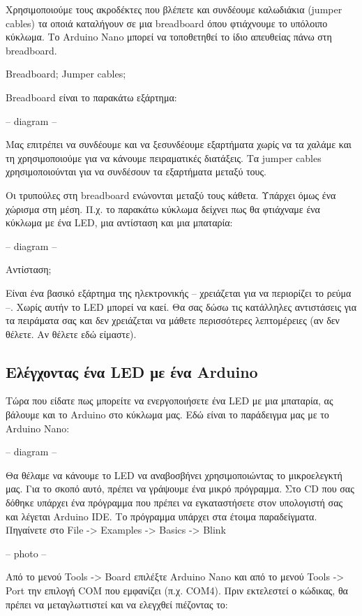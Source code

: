 \documentclass[a4paper,twoside,12pt]{article}
\begin{document}
Χρησιμοποιούμε τους ακροδέκτες που βλέπετε και συνδέουμε καλωδιάκια (jumper cables) τα οποιά καταλήγουν σε μια breadboard όπου φτιάχνουμε το υπόλοιπο κύκλωμα. Το Arduino Nano μπορεί να τοποθετηθεί το ίδιο απευθείας πάνω στη breadboard.

\item[Breadboard; Jumper cables;]

Breadboard είναι το παρακάτω εξάρτημα:

-- diagram --

Μας επιτρέπει να συνδέουμε και να ξεσυνδέουμε εξαρτήματα χωρίς να τα χαλάμε και τη χρησιμοποιούμε για να κάνουμε πειραματικές διατάξεις. Τα jumper cables χρησιμοποιούνται για να συνδέσουν τα εξαρτήματα μεταξύ τους.

Οι τρυπούλες στη breadboard ενώνονται μεταξύ τους κάθετα. Υπάρχει όμως ένα χώρισμα στη μέση.  Π.χ. το παρακάτω κύκλωμα δείχνει πως θα φτιάχναμε ένα κύκλωμα με ένα LED, μια αντίσταση και μια μπαταρία:

-- diagram --


\item[Αντίσταση;]

Είναι ένα βασικό εξάρτημα της ηλεκτρονικής -- χρειάζεται για να περιορίζει το ρεύμα --. Χωρίς αυτήν το LED μπορεί να καεί. Θα σας δώσω τις κατάλληλες αντιστάσεις για τα πειράματα σας και δεν χρειάζεται να μάθετε περισσότερες λεπτομέρειες (αν δεν θέλετε. Αν θέλετε εδώ είμαστε).

\subsection{Ελέγχοντας ένα LED με ένα Arduino}

Τώρα που είδατε πως μπορείτε να ενεργοποιήσετε ένα LED με μια μπαταρία, ας βάλουμε και το Arduino στο κύκλωμα μας. Εδώ είναι το παράδειγμα μας με το Arduino Nano:

-- diagram --

Θα θέλαμε να κάνουμε το LED να αναβοσβήνει χρησιμοποιώντας το μικροελεγκτή μας. Για το σκοπό αυτό, πρέπει να γράψουμε ένα μικρό πρόγραμμα.
Στο CD που σας δόθηκε υπάρχει ένα πρόγραμμα που πρέπει να εγκαταστήσετε στον υπολογιστή σας και λέγεται Arduino IDE.
Το πρόγραμμα υπάρχει στα έτοιμα παραδείγματα. Πηγαίνετε στο File -> Examples -> Basics -> Blink

-- photo --

Από το μενού Tools -> Board επιλέξτε Arduino Nano και από το μενού Tools -> Port την επιλογή COM που εμφανίζει (π.χ. COM4). Πριν εκτελεστεί ο κώδικας, θα πρέπει να μεταγλωττιστεί και να ελεγχθεί πιέζοντας το:
\end{document}
